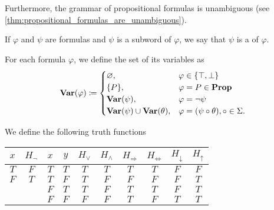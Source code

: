 \begin{definition}
  Furthermore, the grammar of propositional formulas is unambiguous (see \cref{thm:propositional_formulas_are_unambiguous}).

  If $\varphi$ and $\psi$ are formulas and $\psi$ is a subword of $\varphi$, we say that $\psi$ is a  of $\varphi$.

  For each formula $\varphi$, we define the set of its variables as
  \begin{align*}
    \operatorname{\mathbf{Var}}(\varphi) \coloneqq \begin{cases}
      \varnothing,                              &\varphi \in \{ \top, \bot \} \\
      \{ P \},                                  &\varphi = P \in \operatorname{\mathbf{Prop}} \\
      \operatorname{\mathbf{Var}}(\psi),                         &\varphi = \neg \psi \\
      \operatorname{\mathbf{Var}}(\psi) \cup \operatorname{\mathbf{Var}}(\theta), &\varphi = (\psi \circ \theta), \circ \in \Sigma.
    \end{cases}
  \end{align*}
\end{definition}

\begin{definition}\label{def:truth_functions}
  We define the following truth functions
  \begin{Center}
    \begin{tabular}{c | c || c c | c c c c c c}
      $x$    & $H_\neg$ & $x$    & $y$    & $H_\lor$ & $H_\land$ & $H_\Rightarrow$ & $H_{\iff}$ & $H_\downarrow$ & $H_\uparrow$ \\
      \hline
      $T$    & $F$      & $T$    & $T$    & $T$      & $T$       & $T$          & $T$      & $F$            & $F$    \\
      $F$    & $T$      & $T$    & $F$    & $T$      & $F$       & $F$          & $F$      & $F$            & $T$    \\
             &          & $F$    & $T$    & $T$      & $F$       & $T$          & $T$      & $F$            & $T$    \\
             &          & $F$    & $F$    & $F$      & $F$       & $T$          & $F$      & $T$            & $T$
    \end{tabular}
  \end{Center}
\end{definition}

